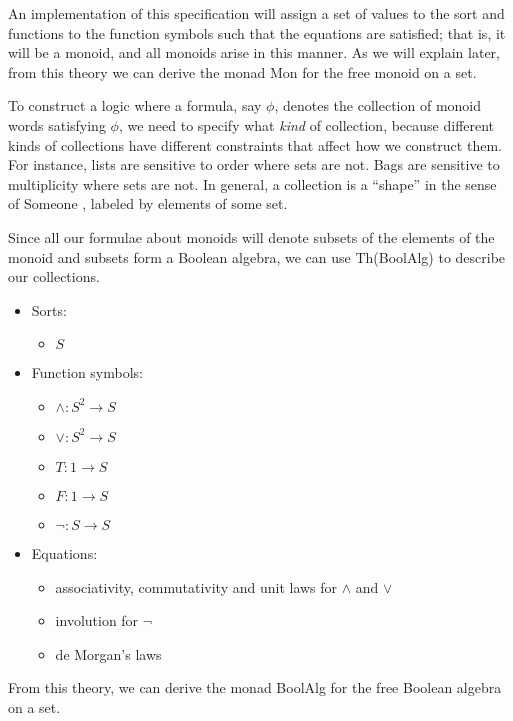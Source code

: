 \documentclass{article}
\newcommand{\maps}{\colon}
\begin{document}
An implementation of this specification will assign a set of values to the sort and functions to the function symbols such that the equations are satisfied; that is, it will be a monoid, and all monoids arise in this manner.  As we will explain later, from this theory we can derive the monad Mon for the free monoid on a set.

To construct a logic where a formula, say $\phi$, denotes the collection of monoid words satisfying $\phi$, we need to specify what \emph{kind} of collection, because different kinds of collections have different constraints that affect how we construct them. For instance, lists are sensitive to order where sets are not. Bags are sensitive to multiplicity where sets are not.  In general, a collection is a ``shape'' in the sense of Someone \cite{someone}, labeled by elements of some set.

Since all our formulae about monoids will denote subsets of the elements of the monoid and subsets form a Boolean algebra, we can use Th(BoolAlg) to describe our collections.
\begin{center}
  \begin{itemize}
    \item Sorts:
    \begin{itemize}
      \item $S$
    \end{itemize}
    \item Function symbols:
    \begin{itemize}
      \item $\land\maps S^2 \to S$
      \item $\lor\maps S^2 \to S$
      \item $T\maps 1 \to S$
      \item $F\maps 1 \to S$
      \item $\neg\maps S \to S$
    \end{itemize}
    \item Equations:
    \begin{itemize}
      \item associativity, commutativity and unit laws for $\land$ and $\lor$
      \item involution for $\neg$
      \item de Morgan's laws
    \end{itemize}
  \end{itemize}
\end{center}
From this theory, we can derive the monad BoolAlg for the free Boolean algebra on a set.
\end{document}
